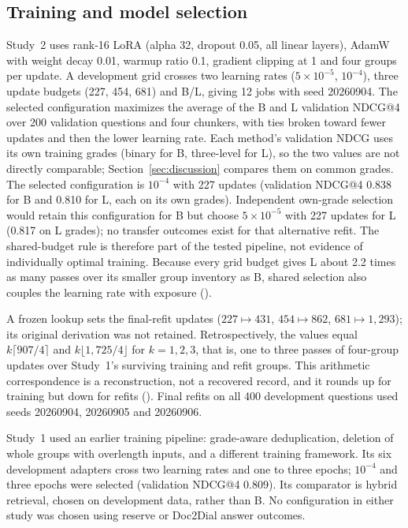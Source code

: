 \subsection{Training and model selection}\label{sec:training}
Study~2 uses rank-16 LoRA (alpha 32, dropout 0.05, all linear layers), AdamW with weight decay 0.01, warmup ratio 0.1, gradient clipping at 1 and four groups per update. A development grid crosses two learning rates ($5\times10^{-5}$, $10^{-4}$), three update budgets (227, 454, 681) and B/L, giving 12 jobs with seed 20260904. The selected configuration maximizes the average of the B and L validation NDCG@4 over 200 validation questions and four chunkers, with ties broken toward fewer updates and then the lower learning rate. Each method's validation NDCG uses its own training grades (binary for B, three-level for L), so the two values are not directly comparable; Section~\ref{sec:discussion} compares them on common grades. The selected configuration is $10^{-4}$ with 227 updates (validation NDCG@4 0.838 for B and 0.810 for L, each on its own grades). Independent own-grade selection would retain this configuration for B but choose $5\times10^{-5}$ with 227 updates for L (0.817 on L grades); no transfer outcomes exist for that alternative refit. The shared-budget rule is therefore part of the tested pipeline, not evidence of individually optimal training. Because every grid budget gives L about 2.2 times as many passes over its smaller group inventory as B, shared selection also couples the learning rate with exposure ().

A frozen lookup sets the final-refit updates ($227\mapsto431$, $454\mapsto862$, $681\mapsto1{,}293$); its original derivation was not retained. Retrospectively, the values equal $k\lceil 907/4\rceil$ and $k\lfloor 1{,}725/4\rfloor$ for $k=1,2,3$, that is, one to three passes of four-group updates over Study~1's surviving training and refit groups. This arithmetic correspondence is a reconstruction, not a recovered record, and it rounds up for training but down for refits (). Final refits on all 400 development questions used seeds 20260904, 20260905 and 20260906.

Study~1 used an earlier training pipeline: grade-aware deduplication, deletion of whole groups with overlength inputs, and a different training framework. Its six development adapters cross two learning rates and one to three epochs; $10^{-4}$ and three epochs were selected (validation NDCG@4 0.809). Its comparator is hybrid retrieval, chosen on development data, rather than B. No configuration in either study was chosen using reserve or Doc2Dial answer outcomes.

